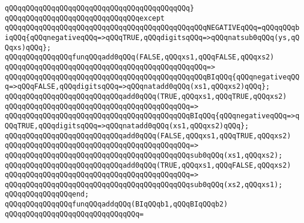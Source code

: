 \verb|qQQqqQQqqQQqqQQqqQQqqQQqqQQqqQQqqQQqqQQqqQQq}|\newline
\verb|qQQqqQQqqQQqqQQqqQQqqQQqqQQqqQQqexcept|\newline
\verb|qQQqqQQqqQQqqQQqqQQqqQQqqQQqqQQqqQQqqQQqqQQqqQQqNEGATIVEqQQq=qQQqqQQqbiqQQq{qQQqnegativeqQQq=>qQQqTRUE,qQQqdigitsqQQq=>qQQqnatsub0qQQq(ys,qQQqxs)qQQq};|\newline
\newline
\newline
\newline
\verb|qQQqqQQqqQQqqQQqfunqQQqadd0qQQq(FALSE,qQQqxs1,qQQqFALSE,qQQqxs2)|\newline
\verb|qQQqqQQqqQQqqQQqqQQqqQQqqQQqqQQqqQQqqQQqqQQqqQQq=>|\newline
\verb|qQQqqQQqqQQqqQQqqQQqqQQqqQQqqQQqqQQqqQQqqQQqqQQqBIqQQq{qQQqnegativeqQQq=>qQQqFALSE,qQQqdigitsqQQq=>qQQqnatadd0qQQq(xs1,qQQqxs2)qQQq};|\newline
\newline
\verb|qQQqqQQqqQQqqQQqqQQqqQQqqQQqadd0qQQq(TRUE,qQQqxs1,qQQqTRUE,qQQqxs2)|\newline
\verb|qQQqqQQqqQQqqQQqqQQqqQQqqQQqqQQqqQQqqQQqqQQq=>|\newline
\verb|qQQqqQQqqQQqqQQqqQQqqQQqqQQqqQQqqQQqqQQqqQQqBIqQQq{qQQqnegativeqQQq=>qQQqTRUE,qQQqdigitsqQQq=>qQQqnatadd0qQQq(xs1,qQQqxs2)qQQq};|\newline
\newline
\verb|qQQqqQQqqQQqqQQqqQQqqQQqqQQqadd0qQQq(FALSE,qQQqxs1,qQQqTRUE,qQQqxs2)|\newline
\verb|qQQqqQQqqQQqqQQqqQQqqQQqqQQqqQQqqQQqqQQqqQQq=>|\newline
\verb|qQQqqQQqqQQqqQQqqQQqqQQqqQQqqQQqqQQqqQQqqQQqsub0qQQq(xs1,qQQqxs2);|\newline
\newline
\verb|qQQqqQQqqQQqqQQqqQQqqQQqqQQqadd0qQQq(TRUE,qQQqxs1,qQQqFALSE,qQQqxs2)|\newline
\verb|qQQqqQQqqQQqqQQqqQQqqQQqqQQqqQQqqQQqqQQqqQQq=>|\newline
\verb|qQQqqQQqqQQqqQQqqQQqqQQqqQQqqQQqqQQqqQQqqQQqsub0qQQq(xs2,qQQqxs1);|\newline
\verb|qQQqqQQqqQQqqQQqend;|\newline
\newline
\newline
\newline
\verb|qQQqqQQqqQQqqQQqfunqQQqaddqQQq(BIqQQqb1,qQQqBIqQQqb2)|\newline
\verb|qQQqqQQqqQQqqQQqqQQqqQQqqQQqqQQq=|\newline
